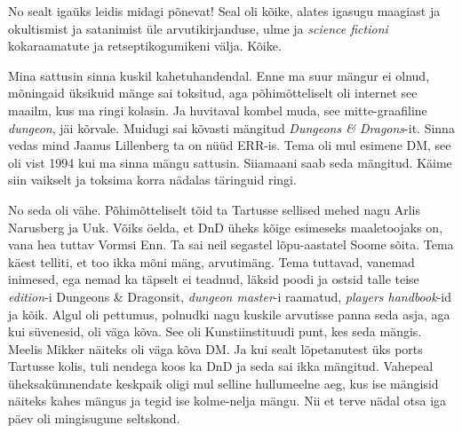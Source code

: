 No sealt igaüks leidis midagi põnevat! Seal oli kõike, alates igasugu maagiast 
ja okultismist ja satanimist üle arvutikirjanduse, ulme ja \emph{science 
fictioni} kokaraamatute ja retseptikogumikeni välja. Kõike.
                 
                 
Mina sattusin sinna kuskil kahetuhandendal. Enne ma suur mängur ei olnud, 
mõningaid üksikuid mänge  sai toksitud, aga põhimõtteliselt oli internet see 
maailm, kus ma ringi kolasin. Ja huvitaval kombel muda, see 
mitte-graafiline \emph{dungeon}, jäi kõrvale. Muidugi sai kõvasti mängitud 
\emph{Dungeons \& Dragons}-it. Sinna vedas mind Jaanus 
Lillenberg ta on nüüd ERR-is. Tema oli mul 
esimene DM, 
see oli vist 1994 kui ma sinna mängu sattusin. Siiamaani saab seda mängitud. 
Käime siin vaikselt ja toksima korra nädalas täringuid ringi.


No seda oli vähe. Põhimõtteliselt  tõid ta Tartusse sellised mehed nagu Arlis 
Narusberg ja Uuk. Võiks öelda, et DnD üheks kõige esimeseks maaletoojaks on, vana 
hea tuttav Vormsi Enn. Ta sai neil segastel lõpu-aastatel Soome sõita. 
Tema käest telliti, et too ikka mõni mäng, arvutimäng. Tema tuttavad, vanemad 
inimesed, ega nemad ka täpselt ei teadnud, läksid poodi ja ostsid talle teise 
\emph{edition}-i Dungeons \& Dragonsit, \emph{dungeon master}-i raamatud, 
\emph{players handbook}-id ja kõik. Algul oli pettumus, polnudki nagu kuskile 
arvutisse panna seda asja, aga kui süvenesid, oli väga kõva. See oli 
Kunstiinstituudi punt, kes seda 
mängis. Meelis Mikker näiteks oli väga kõva DM. Ja 
kui sealt lõpetanutest üks ports Tartusse kolis,  tuli nendega koos ka DnD ja 
seda sai ikka  mängitud. Vahepeal üheksakümnendate keskpaik oligi mul selline 
hullumeelne aeg, kus ise mängisid näiteks kahes mängus ja tegid ise kolme-nelja 
mängu. Nii et terve nädal otsa iga päev oli mingisugune seltskond.

